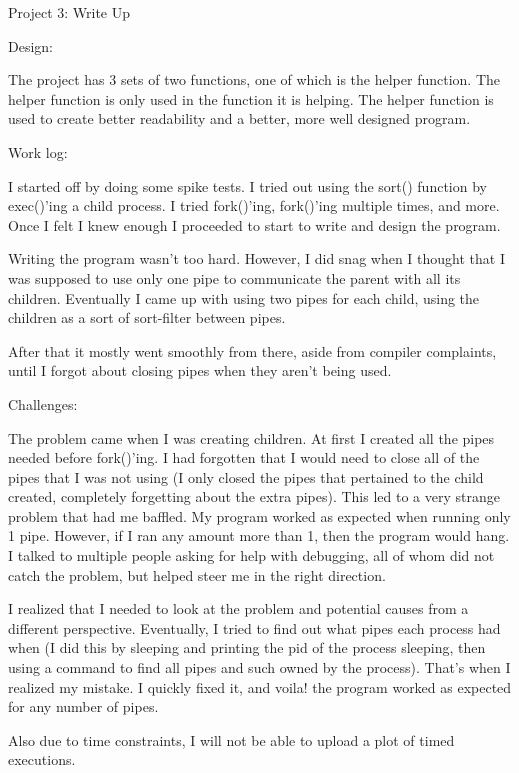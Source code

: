 \documentclass[letterpaper,10pt,titlepage]{article}
\begin{document}
Project 3: Write Up


Design:

The project has 3 sets of two functions, one of which is the helper function. The helper function is only used in the function it is helping. The helper function is used to create better readability and a better, more well designed program.


Work log:

I started off by doing some spike tests. I tried out using the sort() function by exec()'ing a child process. I tried fork()'ing, fork()'ing multiple times, and more. Once I felt I knew enough I proceeded to start to write and design the program. 

Writing the program wasn't too hard. However, I did snag when I thought that I was supposed to use only one pipe to communicate the parent with all its children. Eventually I came up with using two pipes for each child, using the children as a sort of sort-filter between pipes.

After that it mostly went smoothly from there, aside from compiler complaints, until I forgot about closing pipes when they aren't being used.


Challenges:

The problem came when I was creating children. At first I created all the pipes needed before fork()'ing. I had forgotten that I would need to close all of the pipes that I was not using (I only closed the pipes that pertained to the child created, completely forgetting about the extra pipes). This led to a very strange problem that had me baffled. My program worked as expected when running only 1 pipe. However, if I ran any amount more than 1, then the program would hang. I talked to multiple people asking for help with debugging, all of whom did not catch the problem, but helped steer me in the right direction.

I realized that I needed to look at the problem and potential causes from a different perspective. Eventually, I tried to find out what pipes each process had when (I did this by sleeping and printing the pid of the process sleeping, then using a command to find all pipes and such owned by the process). That's when I realized my mistake. I quickly fixed it, and voila! the program worked as expected for any number of pipes.

Also due to time constraints, I will not be able to upload a plot of timed executions. 

%
\end{document}
